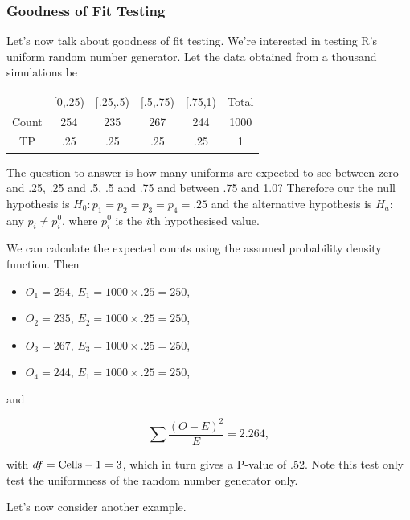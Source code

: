 \documentclass{homework}
\begin{document}
\subsubsection{Goodness of Fit Testing}

Let's now talk about goodness of fit testing. We're interested in testing R's uniform random number generator. Let the data obtained from a thousand simulations be

\begin{tcolorbox}[title=Example 1 of Goodness of Fit Testing]

\begin{center}
\begin{tabular}{ |c|c|c|c|c|c| } 
 \hline
 & [0,.25) & [.25,.5) & [.5,.75) & [.75,1) & Total \\
 Count & 254 & 235 & 267 & 244 & 1000\\ 
 TP & .25 & .25 & .25 & .25 & 1 \\ 
\end{tabular}
\end{center}

The question to answer is how many uniforms are expected to see between zero and .25, .25 and .5, .5 and .75 and between .75 and 1.0? Therefore our the null hypothesis is $H_0: p_1=p_2=p_3=p_4=.25$ and the alternative hypothesis is $H_a:$ any $p_i \neq p_i^0$, where $p_i^0$ is the $i$th hypothesised value. 

We can calculate the expected counts using the assumed probability density function. Then

\begin{itemize}
    \item $O_1 = 254$, $E_1 = 1000\times .25  = 250$,
    \item $O_2 = 235$, $E_2 = 1000\times .25  = 250$,
    \item $O_3 = 267$, $E_3 = 1000\times .25  = 250$,
    \item $O_4 = 244$, $E_1 = 1000\times .25  = 250$,
\end{itemize}

and 

$$
\sum \frac{(O-E)^2}{E} = 2.264,
$$

with $df = \textnormal{Cells} - 1 = 3$, which in turn gives a P-value of .52. Note this test only test the uniformness of the random number generator only. 
\end{tcolorbox}

Let's now consider another example. 
\end{document}
